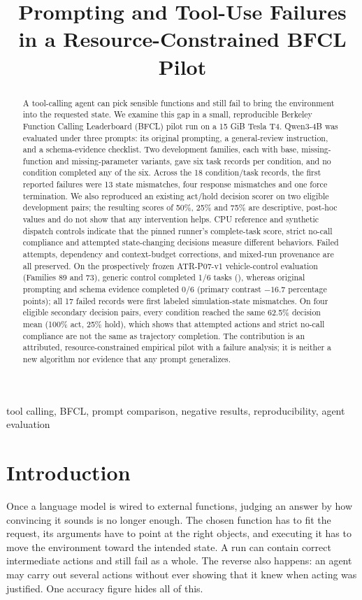 \documentclass[conference]{IEEEtran}
\title{Prompting and Tool-Use Failures in a Resource-Constrained BFCL Pilot}
\author{\IEEEauthorblockN{Omkar Arjun Mohije}
\IEEEauthorblockA{Roll No: MAI2026006\\
M.Tech in IT (Specialization in AI/ML)\\
Indian Institute of Information Technology, Allahabad\\
AI Tools for Research (ATR) Course Study\\
Email: mai2026006@iiita.ac.in}}
\newcommand{\code}[1]{\texttt{\detokenize{#1}}}
\begin{document}
\maketitle
\begin{abstract}
A tool-calling agent can pick sensible functions and still fail to bring the environment into the requested state. We examine this gap in a small, reproducible Berkeley Function Calling Leaderboard (BFCL) pilot run on a 15 GiB Tesla T4. Qwen3-4B was evaluated under three prompts: its original prompting, a general-review instruction, and a schema-evidence checklist. Two development families, each with base, missing-function and missing-parameter variants, gave six task records per condition, and no condition completed any of the six. Across the 18 condition/task records, the first reported failures were 13 state mismatches, four response mismatches and one force termination. We also reproduced an existing act/hold decision scorer on two eligible development pairs; the resulting scores of 50\%, 25\% and 75\% are descriptive, post-hoc values and do not show that any intervention helps. CPU reference and synthetic dispatch controls indicate that the pinned runner's complete-task score, strict no-call compliance and attempted state-changing decisions measure different behaviors. Failed attempts, dependency and context-budget corrections, and mixed-run provenance are all preserved. On the prospectively frozen ATR-P07-v1 vehicle-control evaluation (Families 89 and 73), generic control completed 1/6 tasks (\code{multi_turn_miss_func_73}), whereas original prompting and schema evidence completed 0/6 (primary contrast $-16.7$ percentage points); all 17 failed records were first labeled simulation-state mismatches. On four eligible secondary decision pairs, every condition reached the same 62.5\% decision mean (100\% act, 25\% hold), which shows that attempted actions and strict no-call compliance are not the same as trajectory completion. The contribution is an attributed, resource-constrained empirical pilot with a failure analysis; it is neither a new algorithm nor evidence that any prompt generalizes.
\end{abstract}
\begin{IEEEkeywords}
tool calling, BFCL, prompt comparison, negative results, reproducibility, agent evaluation
\end{IEEEkeywords}

\section{Introduction}
Once a language model is wired to external functions, judging an answer by how convincing it sounds is no longer enough. The chosen function has to fit the request, its arguments have to point at the right objects, and executing it has to move the environment toward the intended state. A run can contain correct intermediate actions and still fail as a whole. The reverse also happens: an agent may carry out several actions without ever showing that it knew when acting was justified. One accuracy figure hides all of this.
\end{document}
